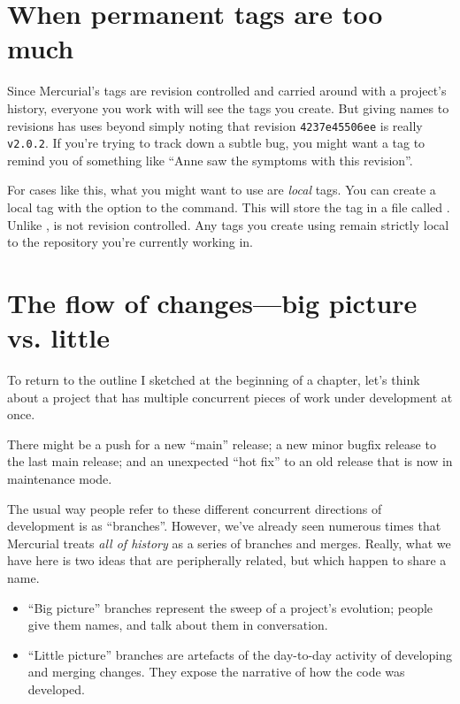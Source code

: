 \section{When permanent tags are too much}

Since Mercurial's tags are revision controlled and carried around with
a project's history, everyone you work with will see the tags you
create.  But giving names to revisions has uses beyond simply noting
that revision \texttt{4237e45506ee} is really \texttt{v2.0.2}.  If
you're trying to track down a subtle bug, you might want a tag to
remind you of something like ``Anne saw the symptoms with this
revision''.

For cases like this, what you might want to use are \emph{local} tags.
You can create a local tag with the  option to the
 command.  This will store the tag in a file called
.  Unlike ,
 is not revision controlled.  Any tags you
create using  remain strictly local to the repository
you're currently working in.

\section{The flow of changes---big picture vs. little}

To return to the outline I sketched at the beginning of a chapter,
let's think about a project that has multiple concurrent pieces of
work under development at once.

There might be a push for a new ``main'' release; a new minor bugfix
release to the last main release; and an unexpected ``hot fix'' to an
old release that is now in maintenance mode.

The usual way people refer to these different concurrent directions of
development is as ``branches''.  However, we've already seen numerous
times that Mercurial treats \emph{all of history} as a series of
branches and merges.  Really, what we have here is two ideas that are
peripherally related, but which happen to share a name.
\begin{itemize}
\item ``Big picture'' branches represent the sweep of a project's
  evolution; people give them names, and talk about them in
  conversation.
\item ``Little picture'' branches are artefacts of the day-to-day
  activity of developing and merging changes.  They expose the
  narrative of how the code was developed.
\end{itemize}


